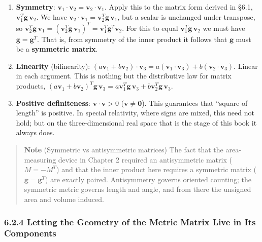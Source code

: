 \documentclass[a4paper,12pt,openany]{book}
\begin{document}
\begin{enumerate}
\def\labelenumi{\arabic{enumi}.}
\item
  \textbf{Symmetry}:
  \(\mathbf{v}_1 \cdot \mathbf{v}_2 = \mathbf{v}_2 \cdot \mathbf{v}_1\).
  Apply this to the matrix form derived in §6.1,
  \(\mathbf{v}_1^T \mathbf{g} \,\mathbf{v}_2\). We have
  \(\mathbf{v}_2 \cdot \mathbf{v}_1 = \mathbf{v}_2^T \mathbf{g} \,\mathbf{v}_1\),
  but a scalar is unchanged under transpose, so
  \(\mathbf{v}_2^T \mathbf{g} \,\mathbf{v}_1 = (\mathbf{v}_2^T \mathbf{g} \,\mathbf{v}_1)^T = \mathbf{v}_1^T \mathbf{g}^T \mathbf{v}_2\).
  For this to equal \(\mathbf{v}_1^T \mathbf{g} \,\mathbf{v}_2\) we must
  have \(\mathbf{g} = \mathbf{g}^T\). That is, from symmetry of the
  inner product it follows that \(\mathbf{g}\) must be a
  \textbf{symmetric matrix}.
\item
  \textbf{Linearity} (bilinearity):
  \((a\mathbf{v}_1 + b\mathbf{v}_2) \cdot \mathbf{v}_3 = a(\mathbf{v}_1 \cdot \mathbf{v}_3) + b(\mathbf{v}_2 \cdot \mathbf{v}_3)\).
  Linear in each argument. This is nothing but the distributive law for
  matrix products,
  \((a\mathbf{v}_1 + b\mathbf{v}_2)^T \mathbf{g} \,\mathbf{v}_3 = a\mathbf{v}_1^T \mathbf{g} \,\mathbf{v}_3 + b\mathbf{v}_2^T \mathbf{g} \,\mathbf{v}_3\).
\item
  \textbf{Positive definiteness}: \(\mathbf{v} \cdot \mathbf{v} > 0\)
  (\(\mathbf{v} \neq \mathbf{0}\)). This guarantees that ``square of
  length'' is positive. In special relativity, where signs are mixed,
  this need not hold; but on the three-dimensional real space that is
  the stage of this book it always does.
\end{enumerate}

\begin{quote}
\textbf{Note} (Symmetric vs antisymmetric matrices) The fact that the
area-measuring device in Chapter 2 required an antisymmetric matrix
(\(M = -M^T\)) and that the inner product here requires a symmetric
matrix (\(\mathbf{g} = \mathbf{g}^T\)) are exactly paired. Antisymmetry
governs oriented counting; the symmetric metric governs length and
angle, and from there the unsigned area and volume induced.
\end{quote}

\hypertarget{letting-the-geometry-of-the-metric-matrix-live-in-its-components}{%
\subsubsection{6.2.4 Letting the Geometry of the Metric Matrix Live in
Its
Components}\label{letting-the-geometry-of-the-metric-matrix-live-in-its-components}}
\end{document}
